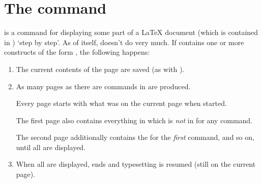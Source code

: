 \documentclass[12pt]{scrartcl}
\let\newslide=\relax
\begin{document}
  \section{The  command}
   is a command for displaying some part of a \LaTeX{} document (which
  is contained in ) `step by step'. As of itself,  doesn't do very much. If
   contains one or more constructs of the form , the
  following happens:
  \begin{enumerate}
  \item The current contents of the page are saved (as with ).

  \item As many pages as there are  commands in  are produced.

    Every page starts with what was on the current page when  started.

    \newslide

    The first page also contains everything in  which is \emph{not} in  for any
     command.

    The second page additionally contains the  for the \emph{first}  command, and so
    on, until all  are displayed.

  \item When all  are displayed,  ends and typesetting is resumed (still on the
    current page).
  \end{enumerate}


  \newslide
\end{document}
